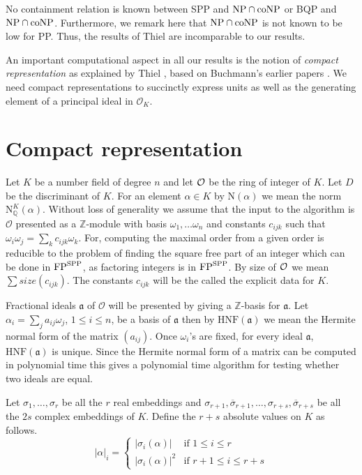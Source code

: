 \documentclass{article}
\newcommand{\Norm}[1]{\mathrm{N}\left(#1\right)}
\renewcommand{\O}{\mathcal{O}}
\newcommand{\HNF}[1]{\ensuremath{\mathrm{HNF}(#1)}}
\newcommand{\Ideal}[1]{\ensuremath{\mathfrak{#1}}}
\newcommand{\Q}[0]{\ensuremath{\mathbb{Q}}}
\newcommand{\FP}{{\rm FP}}
\newcommand{\NP}{{\rm NP}}
\newcommand{\coNP}{\mbox{{\rm coNP}}}
\newcommand{\SPP}{{\rm SPP}}
\theoremstyle{definition}\newtheorem{remark}[theorem]{Remark}
\newcommand {\abs} [1] {\ensuremath{\left\vert#1\right\vert}}
\begin{document}
No containment relation is known between SPP and $\NP\cap\coNP$ or BQP
and $\NP\cap\coNP$. Furthermore, we remark here that $\NP\cap\coNP$ is
not known to be low for PP.  Thus, the results of Thiel
\cite{thiel94class} are incomparable to our results.

An important computational aspect in all our results is the notion of
\emph{compact representation} as explained by Thiel
\cite{thiel94class}, based on Buchmann's earlier papers
\cite{buchmann87units,buchmann87period}. We need compact
representations to succinctly express units as well as the generating
element of a principal ideal in $\O_K$.

\section{Compact representation}\label{two}

Let $K$ be a number field of degree $n$ and let $\cal{O}$ be the ring
of integer of $K$. Let $D$ be the discriminant of $K$. For an element
$\alpha \in K$ by $\Norm{\alpha}$ we mean the norm
$\textrm{N}^K_\Q(\alpha)$. Without loss of generality we assume that
the input to the algorithm is $\mathcal{O}$ presented as a
$\mathbb{Z}$-module with basis $\omega_1, \ldots \omega_n$ and
constants $c_{ijk}$ such that $\omega_i \omega_j = \sum_k c_{ijk}
\omega_k$. For, computing the maximal order from a given order is
reducible to the problem of finding the square free part of an integer
which can be done in $\FP^\SPP$, as factoring integers is in
$\FP^\SPP$. By size of $\cal{O}$ we mean $\sum size(c_{ijk})$. The
constants $c_{ijk}$ will be the called the explicit data for $K$.

Fractional ideals $\Ideal{a}$ of $\mathcal{O}$ will be presented by
giving a $\mathbb{Z}$-basis for $\Ideal{a}$. Let $\alpha_i = \sum_j
a_{ij} \omega_j$, $1 \leq i \leq n$, be a basis of $\Ideal{a}$ then by
$\HNF{\Ideal{a}}$ we mean the Hermite normal form of the matrix
$(a_{ij})$.  Once $\omega_i$'s are fixed, for every ideal $\Ideal{a}$,
$\HNF{\Ideal{a}}$ is unique. Since the Hermite normal form of a matrix
can be computed in polynomial time this gives a polynomial time
algorithm for testing whether two ideals are equal.

Let $\sigma_1,\ldots,\sigma_r$ be all the $r$ real embeddings and
$\sigma_{r+1},\overline{\sigma}_{r+1},\ldots,
\sigma_{r+s},\overline{\sigma}_{r+s}$ be all the $2s$ complex
embeddings of $K$. Define the $r+s$ absolute values on $K$ as follows.
\[
\abs{\alpha}_{i} = \left\{
  \begin{array}{cc}
    \abs{\sigma_i(\alpha)} & \textrm{if } 1 \leq i \leq r \\
    \abs{\sigma_i(\alpha)}^2 & \textrm{if } r+1 \leq i \leq r+s
  \end{array}
\right.
\]
\end{document}
